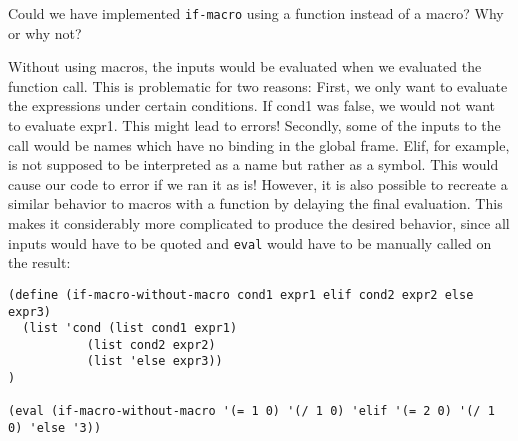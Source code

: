 \begin{blocksection}
\question Could we have implemented \texttt{if-macro} using a function instead of a macro? Why or why not?
\begin{solution}[0.5in]
Without using macros, the inputs would be evaluated when we evaluated the function call. This is problematic for two reasons:
\newline
First, we only want to evaluate the expressions under certain conditions. If cond1 was false, we would not want to evaluate expr1. This might lead to errors!
\newline
Secondly, some of the inputs to the call would be names which have no binding in the global frame. Elif, for example, is not supposed to be interpreted as a name
but rather as a symbol. This would cause our code to error if we ran it as is!
\newline
However, it is also possible to recreate a similar behavior to macros with a function by delaying the final evaluation. This makes it considerably more complicated to produce
the desired behavior, since all inputs would have to be quoted and \texttt{eval} would have to be manually called on the result:
\begin{lstlisting}
(define (if-macro-without-macro cond1 expr1 elif cond2 expr2 else expr3)
  (list 'cond (list cond1 expr1)
           (list cond2 expr2)
           (list 'else expr3))
)

(eval (if-macro-without-macro '(= 1 0) '(/ 1 0) 'elif '(= 2 0) '(/ 1 0) 'else '3))
\end{lstlisting}

\end{solution}
\end{blocksection}
